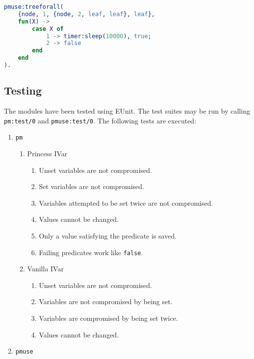 \begin{lstlisting}[language=Erlang,caption={Testing short-circuit semantics of \texttt{treeforall}},label=treeforallcon]
pmuse:treeforall(
    {node, 1, {node, 2, leaf, leaf}, leaf},
    fun(X) ->
        case X of
            1 -> timer:sleep(10000), true;
            2 -> false
        end
    end
).
\end{lstlisting}

\subsection{Testing}

The modules have been tested using EUnit. The test suites may be run by calling
\verb|pm:test/0| and \verb|pmuse:test/0|. The following tests are executed:

\begin{enumerate}
    \item \texttt{pm}
    \begin{enumerate}
        \item Princess IVar
        \begin{enumerate}
            \item Unset variables are not compromised.
            \item Set variables are not compromised.
            \item Variables attempted to be set twice are not compromised.
            \item Values cannot be changed.
            \item Only a value satisfying the predicate is saved.
            \item Failing predicates work like \verb|false|.
        \end{enumerate}
        \item Vanilla IVar
        \begin{enumerate}
            \item Unset variables are not compromised.
            \item Variables are not compromised by being set.
            \item Variables are compromised by being set twice.
            \item Values cannot be changed.
        \end{enumerate}
    \end{enumerate}
    \item \texttt{pmuse}
    \begin{enumerate}

\end{enumerate}
\end{enumerate}

